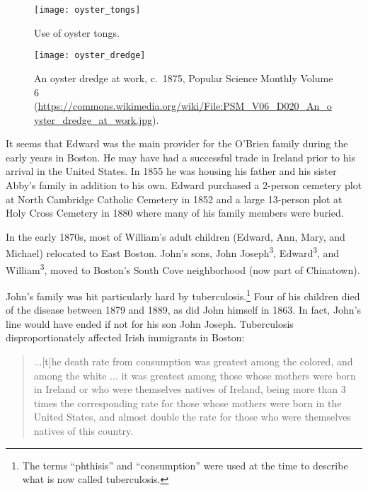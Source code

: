 \begin{figure}
	\centering
	\texttt{[image: oyster\_tongs]}
	\caption{Use of oyster tongs.\cite{MacKenzie:4}}
\end{figure}

\begin{figure}
	\centering
	\texttt{[image: oyster\_dredge]}
	\caption{An oyster dredge at work, c.\ 1875, Popular Science Monthly Volume 6 (\url{https://commons.wikimedia.org/wiki/File:PSM_V06_D020_An_oyster_dredge_at_work.jpg}).}
\end{figure}

It seems that Edward was the main provider for the O'Brien family during the early years in Boston. He may have had a successful trade in Ireland prior to his arrival in the United States. In 1855 he was housing his father and his sister Abby's family in addition to his own.\cite{Census1855William} Edward purchased a 2-person cemetery plot at North Cambridge Catholic Cemetery in 1852\cite{CarolGordon} and a large 13-person plot at Holy Cross Cemetery in 1880\cite{HolyCrossPlot} where many of his family members were buried.

In the early 1870s, most of William's adult children (Edward, Ann, Mary, and Michael) relocated to East Boston. John's sons, John Joseph\textsuperscript{3}, Edward\textsuperscript{3}, and William\textsuperscript{3}, moved to Boston's South Cove neighborhood (now part of Chinatown).\cite{1870sAddresses} 

John's family was hit particularly hard by tuberculosis.\footnote{The terms ``phthisis'' and ``consumption'' were used at the time to describe what is now called tuberculosis.\cite{TuberculosisHistory}} Four of his children died of the disease between 1879 and 1889, as did John himself in 1863.\cite{John2OBrienDeath} In fact, John's line would have ended if not for his son John Joseph. Tuberculosis disproportionately affected Irish immigrants in Boston:

\begin{quote}
	...[t]he death rate from consumption was greatest among the colored, and among the white ... it was greatest among those whose mothers were born in Ireland or who were themselves natives of Ireland, being more than 3 times the corresponding rate for those whose mothers were born in the United States, and almost double the rate for those who were themselves natives of this country.\cite{VitalStatistics}
\end{quote}

